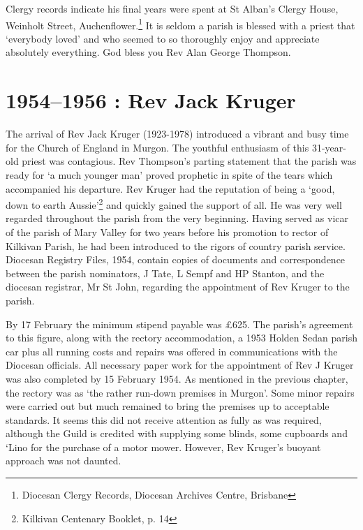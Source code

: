 Clergy records indicate his final years were spent at St Alban's Clergy
House, Weinholt Street, Auchenflower.\footnote{Diocesan Clergy Records,
  Diocesan Archives Centre, Brisbane} It is seldom a parish is blessed
with a priest that `everybody loved' and who seemed to so thoroughly
enjoy and appreciate absolutely everything. God bless you Rev Alan
George Thompson.

\printendnotes[custom]
\setcounter{endnote}{0}
\chapter{1954--1956 : Rev Jack Kruger}

The arrival of Rev Jack Kruger (1923-1978) introduced a vibrant and busy
time for the Church of England in Murgon. The youthful enthusiasm of
this 31-year-old priest was contagious. Rev Thompson's parting statement
that the parish was ready for `a much younger man' proved prophetic in
spite of the tears which accompanied his departure. Rev Kruger had the
reputation of being a `good, down to earth Aussie'\footnote{Kilkivan
  Centenary Booklet, p. 14} and quickly gained the support of all. He
was very well regarded throughout the parish from the very beginning.
Having served as vicar of the parish of Mary Valley for two years before
his promotion to rector of Kilkivan Parish, he had been introduced to
the rigors of country parish service. Diocesan Registry Files, 1954,
contain copies of documents and correspondence between the parish
nominators, J Tate, L Sempf and HP Stanton, and the diocesan registrar,
Mr St John, regarding the appointment of Rev Kruger to the parish.

By 17 February the minimum stipend payable was \pounds625. The parish's
agreement to this figure, along with the rectory accommodation, a 1953
Holden Sedan parish car plus all running costs and repairs was offered
in communications with the Diocesan officials. All necessary paper work
for the appointment of Rev J Kruger was also completed by 15 February
1954. As mentioned in the previous chapter, the rectory was as `the
rather run-down premises in Murgon'. Some minor repairs were carried out
but much remained to bring the premises up to acceptable standards. It
seems this did not receive attention as fully as was required, although
the Guild is credited with supplying some blinds, some cupboards and
`Lino for the purchase of a motor mower. However, Rev Kruger's buoyant
approach was not daunted.

